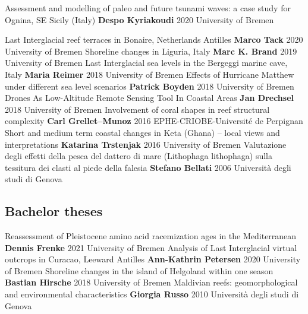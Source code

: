 \documentclass[%
               doublesided,
               paper=a4,
               fontsize=10pt
              ]{my-resume}
\begin{document}
    \publication
	{Assessment and modelling of paleo and future tsunami waves: a case study for Ognina, SE Sicily (Italy)} %
	{\textbf{Despo Kyriakoudi}} %
	{2020} %
	{University of Bremen} %
	{} %

    \publication
	{Last Interglacial reef terraces in Bonaire, Netherlands Antilles} %
	{\textbf{Marco Tack}} %
	{2020} %
	{University of Bremen} %
	{} %
    \publication
	{Shoreline changes in Liguria, Italy} %
	{\textbf{Marc K. Brand}} %
	{2019} %
	{University of Bremen} %
	{} %
    \publication
	{Last Interglacial sea levels in the Bergeggi marine cave, Italy} %
	{\textbf{Maria Reimer}} %
	{2018} %
	{University of Bremen} %
	{} %
    \publication
	{Effects of Hurricane Matthew under different sea level scenarios} %
	{\textbf{Patrick Boyden}} %
	{2018} %
	{University of Bremen} %
	{} %
    \publication
	{Drones As Low-Altitude Remote Sensing Tool In Coastal Areas} %
	{\textbf{Jan Drechsel}} %
	{2018} %
	{University of Bremen} %
	{} %
    \publication
	{Involvement of coral shapes in reef structural complexity} %
	{\textbf{Carl Grellet–Munoz}} %
	{2016} %
	{EPHE-CRIOBE-Université de Perpignan} %
	{} %
    \publication
	{Short and medium term coastal changes in Keta (Ghana) – local views and interpretations} %
	{\textbf{Katarina Trstenjak}} %
	{2016} %
	{University of Bremen} %
	{} %
    \publication
	{Valutazione degli effetti della pesca del dattero di mare (Lithophaga lithophaga) sulla tessitura dei clasti al piede della falesia} %
	{\textbf{Stefano Bellati}} %
	{2006} %
	{Università degli studi di Genova} %
	{} %
    \subsection{Bachelor theses}
    \publication
	{Reassessment of Pleistocene amino acid racemization ages in the Mediterranean} %
	{\textbf{Dennis Frenke}} %
	{2021} %
	{University of Bremen} %
	{} %
    \publication
	{Analysis of Last Interglacial virtual outcrops in Curacao, Leeward Antilles} %
	{\textbf{Ann-Kathrin Petersen}} %
	{2020} %
	{University of Bremen} %
	{} %
    \publication
	{Shoreline changes in the island of Helgoland within one season} %
	{\textbf{Bastian Hirsche}} %
	{2018} %
	{University of Bremen} %
	{} %
    \publication
	{Maldivian reefs: geomorphological and environmental characteristics} %
	{\textbf{Giorgia Russo}} %
	{2010} %
	{Università degli studi di Genova} %
	{} %
	
\end{document}
